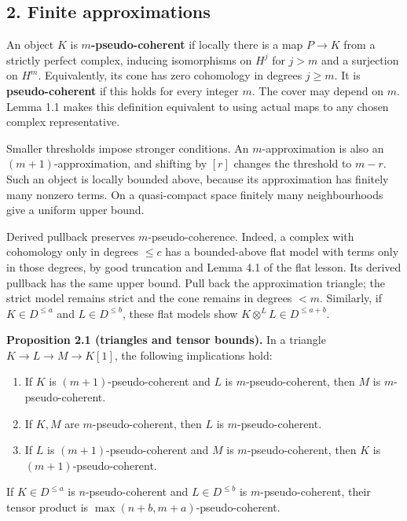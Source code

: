 \documentclass[
  english,
  11pt,
  a4paper,
]{article}
\providecommand{\tightlist}{%
  \setlength{\itemsep}{0pt}\setlength{\parskip}{0pt}}
\begin{document}
\subsection{2. Finite
approximations}\label{perfect-complexes-and-duals--2-finite-approximations}

An object \(K\) is \textbf{\(m\)-pseudo-coherent} if locally there is a
map \(P\to K\) from a strictly perfect complex, inducing isomorphisms on
\(H^j\) for \(j>m\) and a surjection on \(H^m\). Equivalently, its cone
has zero cohomology in degrees \(j\ge m\). It is
\textbf{pseudo-coherent} if this holds for every integer \(m\). The
cover may depend on \(m\). Lemma 1.1 makes this definition equivalent to
using actual maps to any chosen complex representative.

Smaller thresholds impose stronger conditions. An \(m\)-approximation is
also an \((m+1)\)-approximation, and shifting by \([r]\) changes the
threshold to \(m-r\). Such an object is locally bounded above, because
its approximation has finitely many nonzero terms. On a quasi-compact
space finitely many neighbourhoods give a uniform upper bound.

Derived pullback preserves \(m\)-pseudo-coherence. Indeed, a complex
with cohomology only in degrees \(\le c\) has a bounded-above flat model
with terms only in those degrees, by good truncation and Lemma 4.1 of
the flat lesson. Its derived pullback has the same upper bound. Pull
back the approximation triangle; the strict model remains strict and the
cone remains in degrees \(<m\). Similarly, if \(K\in D^{\le a}\) and
\(L\in D^{\le b}\), these flat models show
\(K\otimes^L L\in D^{\le a+b}\).

\textbf{Proposition 2.1 (triangles and tensor bounds).} In a triangle
\(K\to L\to M\to K[1]\), the following implications hold:

\begin{enumerate}
\tightlist
\item
  If \(K\) is \((m+1)\)-pseudo-coherent and \(L\) is
  \(m\)-pseudo-coherent, then \(M\) is \(m\)-pseudo-coherent.
\item
  If \(K,M\) are \(m\)-pseudo-coherent, then \(L\) is
  \(m\)-pseudo-coherent.
\item
  If \(L\) is \((m+1)\)-pseudo-coherent and \(M\) is
  \(m\)-pseudo-coherent, then \(K\) is \((m+1)\)-pseudo-coherent.
\end{enumerate}

If \(K\in D^{\le a}\) is \(n\)-pseudo-coherent and \(L\in D^{\le b}\) is
\(m\)-pseudo-coherent, their tensor product is
\(\max(n+b,m+a)\)-pseudo-coherent.
\end{document}
